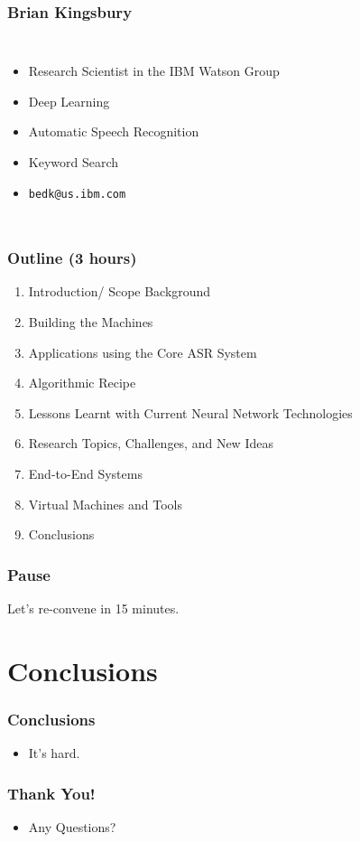 \documentclass[12pt,xcolor=dvipsnames]{beamer}
\begin{document}
\begin{frame}
  \frametitle{Brian Kingsbury}
  \begin{columns}[T]
    \column{2in}
    \begin{itemize}
    \item Research Scientist in the IBM Watson Group
    \item Deep Learning
    \item Automatic Speech Recognition
    \item Keyword Search
    \item \texttt{bedk@us.ibm.com}
    \end{itemize}
    \column{2in}
  \end{columns}
\end{frame}

\begin{frame}
  \frametitle{Outline (3 hours)}
  \begin{enumerate}
  \item Introduction/ Scope Background
  \item Building the Machines
  \item Applications using the Core ASR System
  \item Algorithmic Recipe
  \item Lessons Learnt with Current Neural Network Technologies
  \item Research Topics, Challenges, and New Ideas
  \item End-to-End Systems
  \item Virtual Machines and Tools
  \item Conclusions
  \end{enumerate}
\end{frame}

\begin{frame}
  \frametitle{Pause}
  Let's re-convene in 15 minutes.
\end{frame}



\section{Conclusions}

\begin{frame}
  \frametitle{Conclusions}
  \begin{itemize}
  \item It's hard.
  \end{itemize}
\end{frame}

\begin{frame}
  \frametitle{Thank You!}
  \begin{itemize}
  \item Any Questions?
  \end{itemize}
\end{frame}


\end{document}
